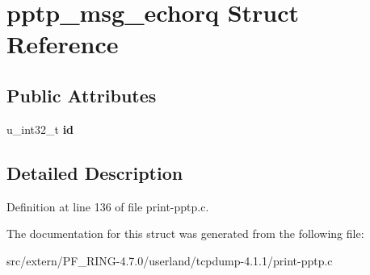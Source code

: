 \hypertarget{structpptp__msg__echorq}{
\section{pptp\_\-msg\_\-echorq Struct Reference}
\label{structpptp__msg__echorq}
}
\subsection*{Public Attributes}
\begin{DoxyCompactItemize}
\item 
\hypertarget{structpptp__msg__echorq_a32ebb7ffbf13fa31ea7443d082748af7}{
u\_\-int32\_\-t {\bfseries id}}
\label{structpptp__msg__echorq_a32ebb7ffbf13fa31ea7443d082748af7}

\end{DoxyCompactItemize}


\subsection{Detailed Description}


Definition at line 136 of file print-\/pptp.c.



The documentation for this struct was generated from the following file:\begin{DoxyCompactItemize}
\item 
src/extern/PF\_\-RING-\/4.7.0/userland/tcpdump-\/4.1.1/print-\/pptp.c\end{DoxyCompactItemize}
